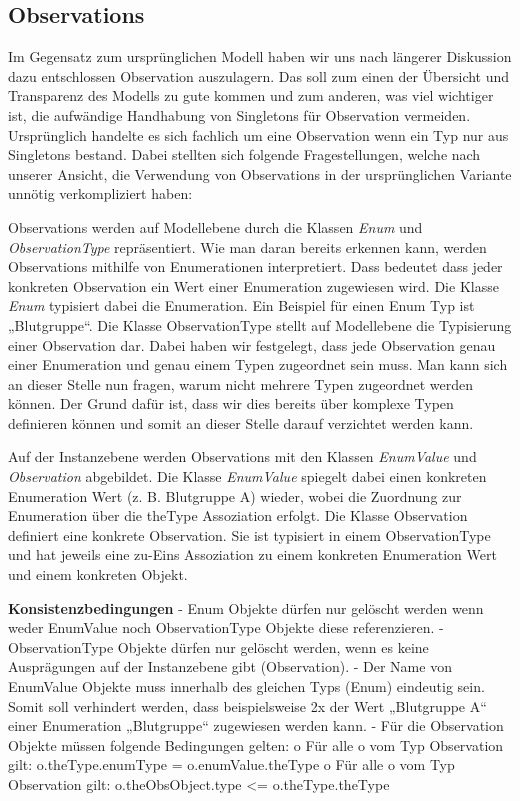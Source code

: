 \subsection{Observations}
Im Gegensatz zum ursprünglichen Modell haben wir uns nach längerer Diskussion dazu entschlossen Observation auszulagern. 
Das soll zum einen der Übersicht und Transparenz des Modells zu gute kommen und zum anderen, was viel wichtiger ist, 
die aufwändige Handhabung von Singletons für Observation vermeiden. 
Ursprünglich handelte es sich fachlich um eine Observation wenn ein Typ nur aus Singletons bestand. 
Dabei stellten sich folgende Fragestellungen, welche nach unserer Ansicht, 
die Verwendung von Observations in der ursprünglichen Variante unnötig verkompliziert haben:


Observations werden auf Modellebene durch die Klassen \emph{Enum} und \emph{ObservationType} repräsentiert. 
Wie man daran bereits erkennen kann, werden Observations mithilfe von Enumerationen interpretiert. 
Dass bedeutet dass jeder konkreten Observation ein Wert einer Enumeration zugewiesen wird. 
Die Klasse \emph{Enum} typisiert dabei die Enumeration. 
Ein Beispiel für einen Enum Typ ist „Blutgruppe“. Die Klasse ObservationType stellt auf Modellebene die 
Typisierung einer Observation dar. Dabei haben wir festgelegt, dass jede Observation genau einer Enumeration 
und genau einem Typen zugeordnet sein muss. Man kann sich an dieser Stelle nun fragen, warum nicht mehrere Typen 
zugeordnet werden können. Der Grund dafür ist, dass wir dies bereits über komplexe Typen definieren können und somit 
an dieser Stelle darauf verzichtet werden kann.


Auf der Instanzebene werden Observations mit den Klassen \emph{EnumValue} und \emph{Observation} abgebildet. 
Die Klasse \emph{EnumValue} spiegelt dabei einen konkreten Enumeration Wert (z. B. Blutgruppe A) wieder, 
wobei die Zuordnung zur Enumeration über die theType Assoziation erfolgt. 
Die Klasse Observation definiert eine konkrete Observation. 
Sie ist typisiert in einem ObservationType und hat jeweils eine zu-Eins Assoziation zu einem konkreten Enumeration Wert 
und einem konkreten Objekt.

\textbf{Konsistenzbedingungen} \newline
-	Enum Objekte dürfen nur gelöscht werden wenn weder EnumValue noch ObservationType Objekte diese referenzieren.
-	ObservationType Objekte dürfen nur gelöscht werden, wenn es keine Ausprägungen auf der Instanzebene gibt (Observation).
-	Der Name von EnumValue Objekte muss innerhalb des gleichen Typs (Enum) eindeutig sein. Somit soll verhindert werden, dass beispielsweise 2x der Wert „Blutgruppe A“ einer Enumeration „Blutgruppe“ zugewiesen werden kann.
-	Für die Observation Objekte müssen folgende Bedingungen gelten:
o	Für alle o vom Typ Observation gilt:
o.theType.enumType = o.enumValue.theType
o	Für alle o vom Typ Observation gilt:
o.theObsObject.type <= o.theType.theType

